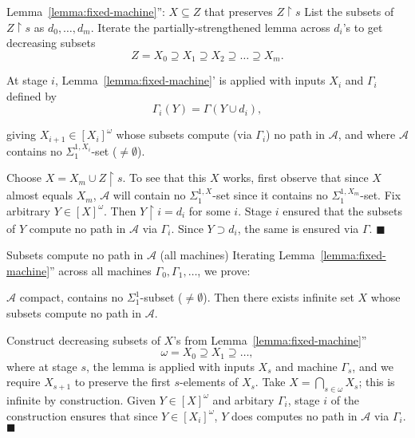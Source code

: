 \begin{frame}{Lemma~\ref{lemma:fixed-machine}'': $X\subseteq Z$ that
preserves $Z\restriction s$}
  List the subsets of $Z\restriction s$ as $d_0,\ldots,d_m$. Iterate the
  partially-strengthened lemma across $d_i$'s to get decreasing subsets
  \[Z=X_0 \supseteq X_1 \supseteq X_2 \supseteq\ldots \supseteq X_m.\]

  At stage $i$, Lemma~\ref{lemma:fixed-machine}' is applied with inputs
  $X_i$ and $\Gamma_i$ defined by
  \[\Gamma_i(Y) =\Gamma(Y\cup d_i),\]

  giving $X_{i+1}\in[X_i]^\omega$ whose subsets compute (via
  $\Gamma_i$) no path in $\mathcal{A}$, and where $\mathcal{A}$ contains no
  $\Sigma_1^{1,X_i}$-set ($\neq\emptyset$).

  \vspace{0.5em}
  Choose $X=X_m\cup Z\restriction s$. To see that this $X$ works, first
  observe that since $X$ almost equals $X_m$, $\mathcal{A}$ will
  contain no $\Sigma_1^{1,X}$-set since it contains no
  $\Sigma_1^{1,X_m}$-set. Fix arbitrary $Y\in[X]^\omega$. Then
  $Y\restriction i=d_i$ for some $i$. Stage $i$ ensured that the subsets of
  $Y$ compute no path in $\mathcal{A}$ via $\Gamma_i$. Since $Y\supset
  d_i$, the same is ensured via $\Gamma$. $\blacksquare$


\end{frame}

\begin{frame}{Subsets compute no path in $\mathcal{A}$ (all machines)}
  Iterating Lemma~\ref{lemma:fixed-machine}'' across all machines
  $\Gamma_0,\Gamma_1,\ldots$, we prove:
  \begin{main-thm*}
    $\mathcal{A}$ compact, contains no $\Sigma_1^1$-subset
    ($\neq\emptyset$). Then there exists infinite set $X$ whose subsets
    compute no path in $\mathcal{A}$.
  \end{main-thm*}

  Construct decreasing subsets of $X$'s from
  Lemma~\ref{lemma:fixed-machine}''
  \[\omega= X_0\supseteq X_1\supseteq\ldots,\]
  where at stage $s$, the lemma is applied with inputs $X_s$ and machine
  $\Gamma_s$, and we require $X_{s+1}$ to preserve the first $s$-elements
  of $X_s$. Take $X=\bigcap_{s\in\omega}X_s$; this is infinite by
  construction. Given $Y\in[X]^\omega$ and arbitary $\Gamma_i$, stage $i$
  of the construction ensures that since $Y\in[X_i]^\omega$, $Y$ does
  computes no path in $\mathcal{A}$ via $\Gamma_i$. $\blacksquare$
\end{frame}

